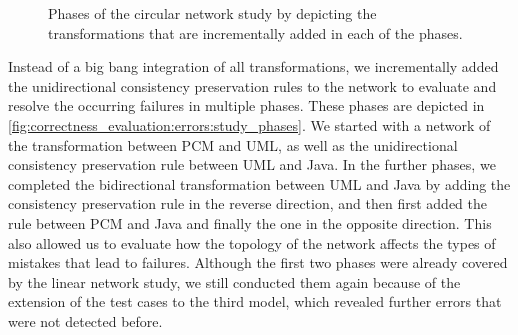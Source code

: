 \begin{figure}
    \centering
    
    \caption[Phases of second case study]{Phases of the circular network study by depicting the transformations that are incrementally added in each of the phases.}
    \label{fig:correctness_evaluation:errors:study_phases}
\end{figure}

Instead of a big bang integration of all transformations, we incrementally added the unidirectional consistency preservation rules to the network to evaluate and resolve the occurring failures in multiple phases.
These phases are depicted in \autoref{fig:correctness_evaluation:errors:study_phases}.
We started with a network of the transformation between \gls{PCM} and \gls{UML}, as well as the unidirectional consistency preservation rule between \gls{UML} and Java.
In the further phases, we completed the bidirectional transformation between \gls{UML} and Java by adding the consistency preservation rule in the reverse direction, and then first added the rule between \gls{PCM} and Java and finally the one in the opposite direction.
This also allowed us to evaluate how the topology of the network affects the types of mistakes that lead to failures.
Although the first two phases were already covered by the linear network study, we still conducted them again because of the extension of the test cases to the third model, which revealed further errors that were not detected before.



